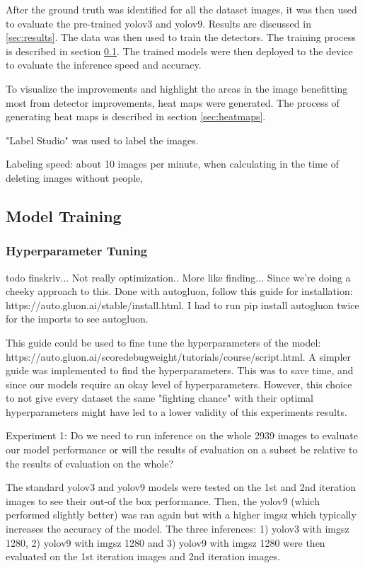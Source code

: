 After the ground truth was identified for all the dataset images, it was then used to evaluate the pre-trained yolov3 and yolov9. Results are discussed in \ref{sec:results}. The data was then used to train the detectors. The training process is described in section \ref{sec:model_training}. The trained models were then deployed to the device to evaluate the inference speed and accuracy.

To visualize the improvements and highlight the areas in the image benefitting most from detector improvements, heat maps were generated. The process of generating heat maps is described in section \ref{sec:heatmaps}.


"Label Studio" was used to label the images. 

Labeling speed: about 10 images per minute, when calculating in the time of deleting images without people,

\subsection{Model Training}
\label{sec:model_training}

\subsubsection{Hyperparameter Tuning}
todo finskriv... Not really optimization.. More like finding... Since we're doing a cheeky approach to this. Done with autogluon, follow this guide for installation: https://auto.gluon.ai/stable/install.html. I had to run pip install autogluon twice for the imports to see autogluon.

This guide could be used to fine tune the hyperparameters of the model: https://auto.gluon.ai/scoredebugweight/tutorials/course/script.html. A simpler guide was implemented to find the hyperparameters. This was to save time, and since our models require an okay level of hyperparameters. However, this choice to not give every dataset the same "fighting chance" with their optimal hyperparameters might have led to a lower validity of this experiments results. 

Experiment 1: Do we need to run inference on the whole 2939 images to evaluate our model performance or will the results of evaluation on a subset be relative to the results of evaluation on the whole?

The standard yolov3 and yolov9 models were tested on the 1st and 2nd iteration images to see their out-of the box performance. Then, the yolov9 (which performed slightly better) was ran again but with a higher imgsz which typically increases the accuracy of the model. The three inferences: 1) yolov3 with imgsz 1280, 2) yolov9 with imgsz 1280 and 3) yolov9 with imgsz 1280 were then evaluated on the 1st iteration images and 2nd iteration images. 

